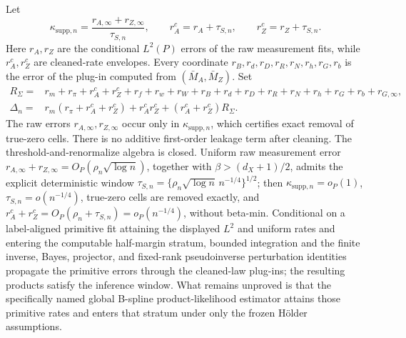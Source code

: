 Let
\[
 \kappa_{\mathrm{supp},n}
 =\frac{r_{A,\infty}+r_{Z,\infty}}{\tau_{S,n}},
 \qquad
 r_A^c=r_A+\tau_{S,n},
 \qquad
 r_Z^c=r_Z+\tau_{S,n}.
\]
Here \(r_A,r_Z\) are the conditional \(L^2(P)\) errors of the raw measurement fits, while \(r_A^c,r_Z^c\) are cleaned-rate envelopes.  Every coordinate \(r_B,r_d,r_D,r_R,r_N,r_h,r_G,r_b\) is the error of the plug-in computed from \((\bar M_A,\bar M_Z)\).  Set
\[
\begin{aligned}
 R_\Sigma={}&r_m+r_\pi+r_A^c+r_Z^c+r_f+r_w+r_W+r_B+r_d+r_D
 +r_R+r_N+r_h+r_G+r_b+r_{G,\infty},\\
 \Delta_n={}&r_m(r_\pi+r_A^c+r_Z^c)+r_A^cr_Z^c
 +(r_A^c+r_Z^c)R_\Sigma.
\end{aligned}
\]
The raw errors \(r_{A,\infty},r_{Z,\infty}\) occur only in \(\kappa_{\mathrm{supp},n}\), which certifies exact removal of true-zero cells.  There is no additive first-order leakage term after cleaning.
The threshold-and-renormalize algebra is closed.  Uniform raw measurement error \(r_{A,\infty}+r_{Z,\infty}=O_P(\rho_n\sqrt{\log n})\), together with \(\beta>(d_X+1)/2\), admits the explicit deterministic window \(\tau_{S,n}=\{\rho_n\sqrt{\log n}\,n^{-1/4}\}^{1/2}\); then \(\kappa_{\mathrm{supp},n}=o_P(1)\), \(\tau_{S,n}=o(n^{-1/4})\), true-zero cells are removed exactly, and \(r_A^c+r_Z^c=O_P(\rho_n+\tau_{S,n})=o_P(n^{-1/4})\), without beta-min.  Conditional on a label-aligned primitive fit attaining the displayed \(L^2\) and uniform rates and entering the computable half-margin stratum, bounded integration and the finite inverse, Bayes, projector, and fixed-rank pseudoinverse perturbation identities propagate the primitive errors through the cleaned-law plug-ins; the resulting products satisfy the inference window.  What remains unproved is that the specifically named global B-spline product-likelihood estimator attains those primitive rates and enters that stratum under only the frozen H\"older assumptions.
